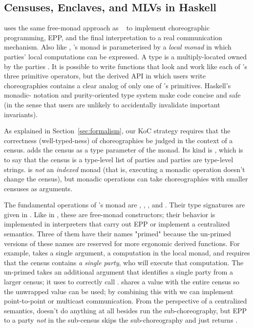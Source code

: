 \subsection{Censuses, Enclaves, and MLVs in Haskell}
\label{sec:implementation}

\MultiChor uses the same free-monad approach as \HasChor~\cite{shen-haschor} to implement choreographic programming, EPP,
and the final interpretation to a real communication mechanism.
Also like \HasChor, \MultiChor's  monad is parameterised by a \emph{local monad} in which parties' local computations can be expressed.
A \MultiChor type  is a multiply-located  owned by the parties .
It is possible to write \MultiChor functions that look and work like each of \HasChor's three primitive operators,
but the derived API in which users write \MultiChor choreographies contains a clear analog of only one of \HasChor's primitives.
Haskell's monadic- notation and purity-oriented type system make \MultiChor code concise and safe
(in the sense that users are unlikely to accidentally invalidate important invariants).

As explained in Section~\ref{sec:formalism},
our KoC strategy requires that the correctness (well-typed-ness) of choreographies be judged in the context of a census.
\MultiChor adds the census as a type parameter of the  monad.
Its kind is \inlinecode{[Symbol]},
which is to say that the census is a type-level list of parties and parties are type-level strings.
 is \emph{not} an \emph{indexed} monad (that is, executing a monadic operation doesn't change the census),
but monadic operations can take choreographies with smaller censuses as arguments.

The fundamental operations of \MultiChor's  monad are
, , , and .
Their type signatures are given in .
Like in \HasChor, these are free-monad constructors; their behavior is implemented in interpreters
that carry out EPP or implement a centralized semantics.
Three of them have their names "primed" because the un-primed versions of these names are reserved for more ergonomic derived functions.
For example,  takes a single argument, a computation in the local monad, and requires that the census contains
\emph{a single party}, who will execute that computation.
The un-primed  takes an additional argument that identifies a single party from a larger census;
it uses  to correctly call .
 shares a  value with the entire census so the unwrapped value can be used;
by combining this with  we can implement point-to-point or multicast communication.
From the perspective of a centralized semantics,  doesn't do anything at all besides run
the sub-choreography,
but EPP to a party \emph{not} in the sub-census skips the sub-choreography and just returns .

